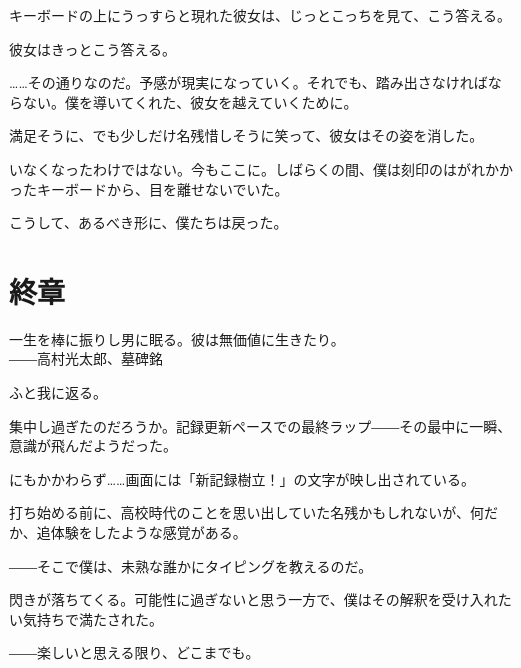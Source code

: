 キーボードの上にうっすらと現れた彼女は、じっとこっちを見て、こう答える。



彼女はきっとこう答える。


……その通りなのだ。予感が現実になっていく。それでも、踏み出さなければならない。僕を導いてくれた、彼女を越えていくために。





満足そうに、でも少しだけ名残惜しそうに笑って、彼女はその姿を消した。

いなくなったわけではない。今もここに。しばらくの間、僕は刻印のはがれかかったキーボードから、目を離せないでいた。

こうして、あるべき形に、僕たちは戻った。

\section*{終章}
\begin{screen}
一生を棒に振りし男に眠る。彼は無価値に生きたり。\\
――高村光太郎、墓碑銘
\end{screen}

ふと我に返る。

集中し過ぎたのだろうか。記録更新ペースでの最終ラップ――その最中に一瞬、意識が飛んだようだった。

にもかかわらず……画面には「新記録樹立！」の文字が映し出されている。

打ち始める前に、高校時代のことを思い出していた名残かもしれないが、何だか、追体験をしたような感覚がある。

――そこで僕は、未熟な誰かにタイピングを教えるのだ。

閃きが落ちてくる。可能性に過ぎないと思う一方で、僕はその解釈を受け入れたい気持ちで満たされた。


――楽しいと思える限り、どこまでも。

